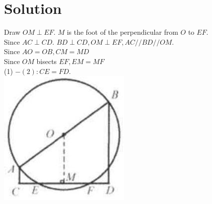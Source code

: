 \documentclass{article}
\begin{document}
\section*{Solution}
Draw \(O M \perp E F\). \(M\) is the foot of the perpendicular from \(O\) to \(E F\).\\
Since \(A C \perp C D\). \(B D \perp C D, O M \perp E F, A C / / B D / / O M\).\\
Since \(A O=O B, C M=M D\)\\
Since \(O M\) bisects \(E F, E M=M F\)\\
(1) \(-(2): C E=F D\).\\
\centering
\includegraphics[width=\textwidth]{images/reasoning_image_1.jpg}
\end{document}
